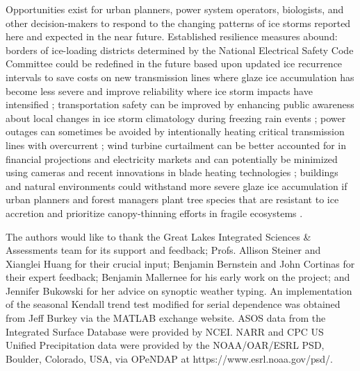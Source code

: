 \documentclass[twocol]{ametsoc}
\begin{document}
Opportunities exist for urban planners, power system operators, biologists, and other decision-makers to respond to the changing patterns of ice storms reported here and expected in the near future. Established resilience measures abound: borders of ice-loading districts determined by the National Electrical Safety Code Committee could be redefined in the future based upon updated ice recurrence intervals to save costs on new transmission lines where glaze ice accumulation has become less severe and improve reliability where ice storm impacts have intensified \citep{american2013minimum}; transportation safety can be improved by enhancing public awareness about local changes in ice storm climatology during freezing rain events \citep{call2009assessment}; power outages can sometimes be avoided by intentionally heating critical transmission lines with overcurrent \citep{bendel1981review,huneault2005combined}; wind turbine curtailment can be better accounted for in financial projections and electricity markets and can potentially be minimized using cameras and recent innovations in blade heating technologies \citep{bird2014wind}; buildings and natural environments could withstand more severe glaze ice accumulation if urban planners and forest managers plant tree species that are resistant to ice accretion and prioritize canopy-thinning efforts in fragile ecosystems \citep{hauer2006trees}.






%
\acknowledgments
The authors would like to thank the Great Lakes Integrated Sciences \& Assessments team for its support and feedback; Profs. Allison Steiner and Xianglei Huang for their crucial input; Benjamin Bernstein and John Cortinas for their expert feedback; Benjamin Mallernee for his early work on the project; and Jennifer Bukowski for her advice on synoptic weather typing. An implementation of the seasonal Kendall trend test modified for serial dependence was obtained from Jeff Burkey via the MATLAB exchange website. ASOS data from the Integrated Surface Database were provided by NCEI. NARR and CPC US Unified Precipitation data were provided by the NOAA/OAR/ESRL PSD, Boulder, Colorado, USA, via OPeNDAP at https://www.esrl.noaa.gov/psd/.  



\end{document}
